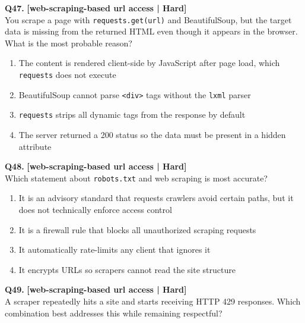 \noindent\textbf{Q47.} \hfill {\small\color{LPUOrange}\textbf{[web-scraping-based url access | Hard]}}\\[2pt]
You scrape a page with \texttt{requests.get(url)} and BeautifulSoup, but the target data is missing from the returned HTML even though it appears in the browser. What is the most probable reason?

\begin{enumerate}[label=(\alph*),topsep=2pt,itemsep=1pt,partopsep=0pt,parsep=0pt]
    \item \relax The content is rendered client-side by JavaScript after page load, which \texttt{requests} does not execute
    \item \relax BeautifulSoup cannot parse \texttt{<div>} tags without the \texttt{lxml} parser
    \item \relax \texttt{requests} strips all dynamic tags from the response by default
    \item \relax The server returned a 200 status so the data must be present in a hidden attribute
\end{enumerate}
\vspace{2mm}

\noindent\textbf{Q48.} \hfill {\small\color{LPUOrange}\textbf{[web-scraping-based url access | Hard]}}\\[2pt]
Which statement about \texttt{robots.txt} and web scraping is most accurate?

\begin{enumerate}[label=(\alph*),topsep=2pt,itemsep=1pt,partopsep=0pt,parsep=0pt]
    \item \relax It is an advisory standard that requests crawlers avoid certain paths, but it does not technically enforce access control
    \item \relax It is a firewall rule that blocks all unauthorized scraping requests
    \item \relax It automatically rate-limits any client that ignores it
    \item \relax It encrypts URLs so scrapers cannot read the site structure
\end{enumerate}
\vspace{2mm}

\noindent\textbf{Q49.} \hfill {\small\color{LPUOrange}\textbf{[web-scraping-based url access | Hard]}}\\[2pt]
A scraper repeatedly hits a site and starts receiving HTTP 429 responses. Which combination best addresses this while remaining respectful?

